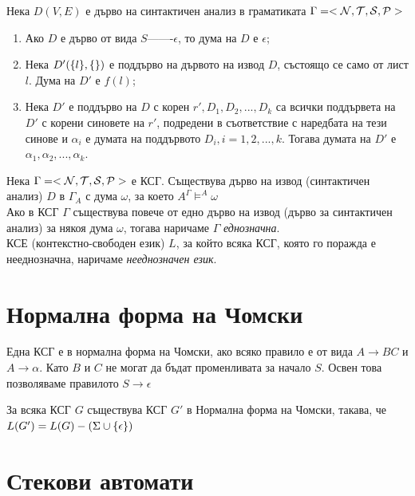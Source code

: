 \documentclass[11pt]{article}
\begin{document}
 Нека $D(V, E)$ е дърво на синтактичен анализ в граматиката $\Gamma = <\mathcal{N}, \mathcal{T}, \mathcal{S}, \mathcal{P}>$

\enumlet
\begin{enumerate}
	\item Ако $D$ е дърво от вида $S$-------$\epsilon$, то дума на $D$ е $\epsilon$;
	\item Нека $D'(\{l\}, \{\})$ е поддърво на дървото на извод $D$, състоящо се само от лист $l$. Дума на $D'$ е $f(l)$;
	\item Нека $D'$ е поддърво на $D$ с корен $r', D_{1}, D_{2}, ..., D_{k}$ са всички поддървета на $D'$ с корени синовете на $r'$, подредени в съответствие с наредбата на тези синове и $\alpha_{i}$ е думата на поддървото $D_{i}, i = 1, 2, ..., k$. Тогава думата на $D'$ е $\alpha_{1}, \alpha_{2}, ...,\alpha_{k}$. 
\end{enumerate} \par

\theorem Нека $\Gamma = <\mathcal{N}, \mathcal{T}, \mathcal{S}, \mathcal{P}>$ е КСГ. Съществува дърво на извод (синтактичен анализ) $D$ в $\Gamma_{A}$ с дума $\omega$, за което $A^{\Gamma} \models^{A} \omega$ \\


 Ако в КСГ $\Gamma$ съществува повече от едно дърво на извод (дърво за синтактичен анализ) за някоя дума $\omega$, тогава наричаме $\Gamma$ \emph{еднозначна}. \\ 

 КСЕ (контекстно-свободен език) $L$, за който всяка КСГ, която го поражда е нееднозначна, наричаме \emph{нееднозначен език}. 

\section{Нормална форма на Чомски}
 Една КСГ е в нормална форма на Чомски, ако всяко правило е от вида $A \to BC$ и $A \to \alpha$. Като $B$ и $C$ не могат да бъдат променливата за начало $S$. Освен това позволяваме правилото $S \to \epsilon$

\theorem За всяка КСГ $G$ съществува КСГ $G'$ в Нормална форма на Чомски, такава, че $L(G') = L(G) - (\Sigma \cup \{{\epsilon}\})$

\section{Стекови автомати}
\end{document}
